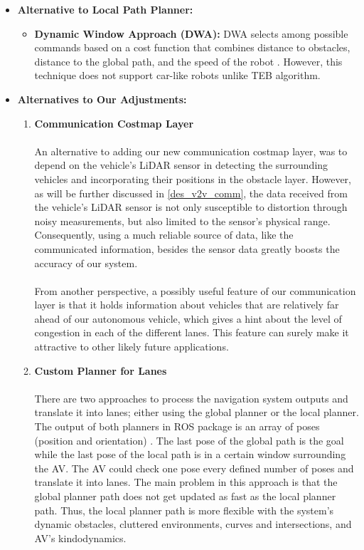 \begin{itemize}
\item \textbf{Alternative to Local Path Planner:}
\begin{itemize}
    \item \textbf{Dynamic Window Approach (DWA):}
    DWA selects among possible commands based on a cost function that combines distance to obstacles, distance to the global path, and the speed of the robot \cite{tbd}. However, this technique does not support car-like robots unlike TEB algorithm. 
\end{itemize}
\item \textbf{Alternatives to Our Adjustments: }
\begin{enumerate}
    \item \textbf{Communication Costmap Layer}
\\ \\
An alternative to adding our new communication costmap layer, was to depend on the vehicle’s LiDAR sensor in detecting the surrounding vehicles and incorporating their positions in the obstacle layer. However, as will be further discussed in \ref{des_v2v_comm}, the data received from the vehicle’s LiDAR sensor is not only susceptible to distortion through noisy measurements, but also limited to the sensor’s physical range. Consequently, using a much reliable source of data, like the communicated information, besides the sensor data greatly boosts the accuracy of our system.
\\ \\
From another perspective, a possibly useful feature of our communication layer is that it holds information about vehicles that are relatively far ahead of our autonomous vehicle, which gives a hint about the level of congestion in each of the different lanes. This feature can surely make it attractive to other likely future applications.
\\
    \item \textbf{Custom Planner for Lanes}
\\ \\
There are two approaches to process the navigation system outputs and translate it into lanes; either using the global planner or the local planner. The output of both planners in ROS package is an array of poses (position and orientation) \cite{ROSBookMorgan}. The last pose of the global path is the goal while the last pose of the local path is in a certain window surrounding the AV. The AV could check one pose every defined number of poses and translate it into lanes. The main problem in this approach is that the global planner path does not get updated as fast as the local planner path. Thus, the local planner path is more flexible with the system's dynamic obstacles, cluttered environments, curves and intersections, and AV's kindodynamics. 
\end{enumerate}
\end{itemize}
 


